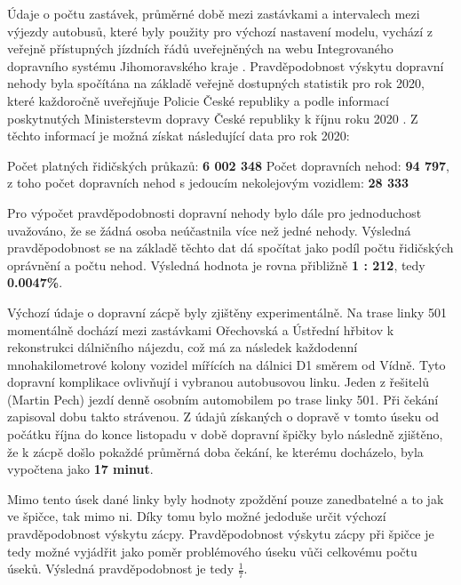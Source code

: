 \documentclass[a4paper]{article}
\begin{document}
            Údaje o počtu zastávek, průměrné době mezi zastávkami a intervalech mezi výjezdy autobusů, které byly použity pro výchozí nastavení modelu, vychází z veřejně přístupných jízdních řádů uveřejněných na webu Integrovaného dopravního systému Jihomoravského kraje \cite{Jizdni_rad}. 
            Pravděpodobnost výskytu dopravní nehody byla spočítána na základě veřejně dostupných statistik pro rok 2020, které každoročně uveřejňuje Policie České republiky a podle informací poskytnutých Ministerstevm dopravy České republiky k říjnu roku 2020 \cite{Accident_statistics}. Z těchto informací je možná získat následující data pro rok 2020:
            \begin{outline}
            	\1 Počet platných řidičských průkazů: \textbf{6 002 348}
            	\1 Počet dopravních nehod: \textbf{94 797}, z toho počet dopravních nehod s jedoucím nekolejovým vozidlem: \textbf{28 333}
            \end{outline}
            
            Pro výpočet pravděpodobnosti dopravní nehody bylo dále pro jednoduchost uvažováno, že se žádná osoba neúčastnila více než jedné nehody. Výsledná pravděpodobnost se na základě těchto dat dá spočítat jako podíl počtu řidičských oprávnění a počtu nehod. Výsledná hodnota je rovna přibližně \textbf{1 : 212}, tedy \textbf{0.0047\%}.
            
            Výchozí údaje o dopravní zácpě byly zjištěny experimentálně. Na trase linky 501 momentálně dochází mezi zastávkami Ořechovská a Ústřední hřbitov k rekonstrukci dálničního nájezdu, což má za následek každodenní mnohakilometrové kolony vozidel mířících na dálnici D1 směrem od Vídně. Tyto dopravní komplikace ovlivňují i vybranou autobusovou linku. Jeden z řešitelů (Martin Pech) jezdí denně osobním automobilem po trase linky 501. Při čekání zapisoval dobu takto strávenou.
            Z údajů získaných o dopravě v tomto úseku od počátku října do konce listopadu v době dopravní špičky bylo následně zjištěno, že k zácpě došlo pokaždé průměrná doba čekání, ke kterému docházelo, byla vypočtena jako \textbf{17 minut}.
            
            Mimo tento úsek dané linky byly hodnoty zpoždění pouze zanedbatelné a to jak ve špičce, tak mimo ni. Díky tomu bylo možné jedoduše určit výchozí pravděpodobnost výskytu zácpy. Pravděpodobnost výskytu zácpy při špičce je tedy možné vyjádřit jako poměr problémového úseku vůči celkovému počtu úseků. Výsledná pravděpodobnost je tedy \textbf{$\frac{1}{7}$}. 
            
\end{document}
